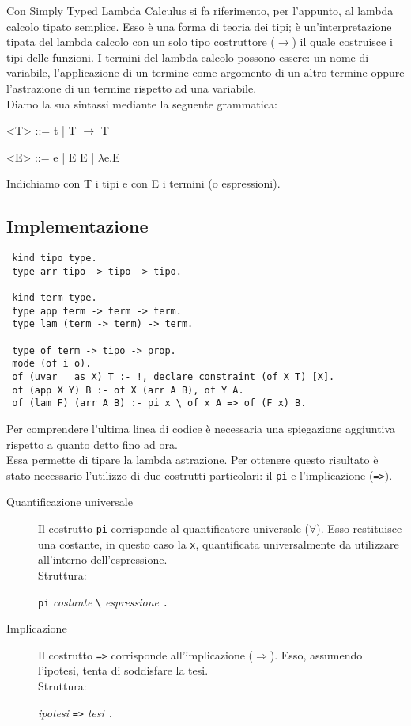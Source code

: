 \documentclass[12pt,a4paper,openright,twoside]{report}
\begin{document}
Con Simply Typed Lambda Calculus si fa riferimento, per l'appunto, al lambda calcolo tipato semplice. Esso è una forma di teoria dei tipi; è un'interpretazione tipata del lambda calcolo con un solo tipo costruttore ($\rightarrow$) il quale costruisce i tipi delle funzioni. I termini del lambda calcolo possono essere: un nome di variabile, l'applicazione di un termine come argomento di un altro termine oppure l'astrazione di un termine rispetto ad una variabile.\\
Diamo la sua sintassi mediante la seguente grammatica:
\begin{grammar}\centering
 \let\syntleft\relax    %
 \let\syntright\relax   %
 <T> ::= t | T $\rightarrow$ T
 
 <E> ::= e | E E | $\lambda$e.E
\end{grammar}
Indichiamo con T i tipi e con E i termini (o espressioni).

\subsection{Implementazione}
\begin{verbatim}
 kind tipo type.
 type arr tipo -> tipo -> tipo.

 kind term type.
 type app term -> term -> term.
 type lam (term -> term) -> term.

 type of term -> tipo -> prop.
 mode (of i o).
 of (uvar _ as X) T :- !, declare_constraint (of X T) [X].
 of (app X Y) B :- of X (arr A B), of Y A.
 of (lam F) (arr A B) :- pi x \ of x A => of (F x) B.
\end{verbatim}
Per comprendere l'ultima linea di codice è necessaria una spiegazione aggiuntiva rispetto a quanto detto fino ad ora.\\
Essa permette di tipare la lambda astrazione. Per ottenere questo risultato è stato necessario l'utilizzo di due costrutti particolari: il \verb"pi" e l'implicazione (\verb"=>").\\
\begin{description}
 \item[Quantificazione universale] Il costrutto \verb"pi" corrisponde al quantificatore universale ($\forall$). Esso restituisce una costante, in questo caso la \verb"x", quantificata universalmente da utilizzare all'interno dell'espressione.\\
 Struttura:
 \begin{center}
  \verb"pi" \textit{costante} \verb"\" \textit{espressione} \verb"."
 \end{center}
 \item[Implicazione] Il costrutto \verb"=>" corrisponde all'implicazione ($\Rightarrow$). Esso, assumendo l'ipotesi, tenta di soddisfare la tesi.\\
 Struttura:
 \begin{center}
  \textit{ipotesi} \verb"=>" \textit{tesi} \verb"."
 \end{center}
\end{description}
\end{document}

